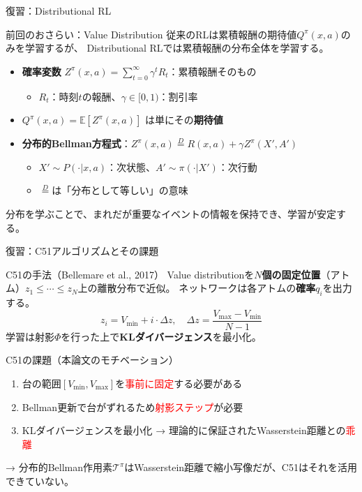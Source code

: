 \documentclass[aspectratio=169, dvipdfmx, 11pt]{beamer}
\newcommand{\red}[1]{\textcolor{red}{#1}}
\begin{document}
\begin{frame}{復習：Distributional RL}
  \begin{block}{前回のおさらい：Value Distribution}
    従来のRLは累積報酬の期待値$Q^\pi(x,a)$のみを学習するが、
    Distributional RLでは累積報酬の\alert{分布全体}を学習する。
  \end{block}
  \vfill
  \begin{itemize}
    \item \textbf{確率変数} $Z^\pi(x,a) = \sum_{t=0}^{\infty} \gamma^t R_t$：累積報酬そのもの
    \begin{itemize}
      \item $R_t$：時刻$t$の報酬、$\gamma \in [0,1)$：割引率
    \end{itemize}
    \item $Q^\pi(x,a) = \mathbb{E}[Z^\pi(x,a)]$ は単にその\textbf{期待値}
    \item \textbf{分布的Bellman方程式}：$Z^\pi(x,a) \overset{D}{=} R(x,a) + \gamma Z^\pi(X', A')$
    \begin{itemize}
      \item $X' \sim P(\cdot|x,a)$：次状態、$A' \sim \pi(\cdot|X')$：次行動
      \item $\overset{D}{=}$は「分布として等しい」の意味
    \end{itemize}
  \end{itemize}
  \vfill
  {\small 分布を学ぶことで、まれだが重要なイベントの情報を保持でき、学習が安定する。}
\end{frame}

\begin{frame}{復習：C51アルゴリズムとその課題}
  \begin{block}{C51の手法（Bellemare et al., 2017）}
    Value distributionを\textbf{$N$個の固定位置}（アトム）$z_1 \leq \cdots \leq z_N$上の離散分布で近似。
    ネットワークは各アトムの\textbf{確率}$q_i$を出力する。
    \vspace{-4pt}
    \[
      z_i = V_{\min} + i \cdot \Delta z, \quad \Delta z = \frac{V_{\max} - V_{\min}}{N-1}
    \]
    \vspace{-8pt}
    {\small 学習は射影$\Phi$を行った上で\textbf{KLダイバージェンス}を最小化。}
  \end{block}
  \vfill
  \begin{alertblock}{C51の課題（本論文のモチベーション）}
    \begin{enumerate}
      \item 台の範囲$[V_{\min}, V_{\max}]$を\red{事前に固定}する必要がある
      \item Bellman更新で台がずれるため\red{射影ステップ}が必要
      \item KLダイバージェンスを最小化 → 理論的に保証されたWasserstein距離との\red{乖離}
    \end{enumerate}
  \end{alertblock}
  \vfill
  {\small → 分布的Bellman作用素$\mathcal{T}^\pi$はWasserstein距離で縮小写像だが、C51はそれを活用できていない。}
\end{frame}
\end{document}
